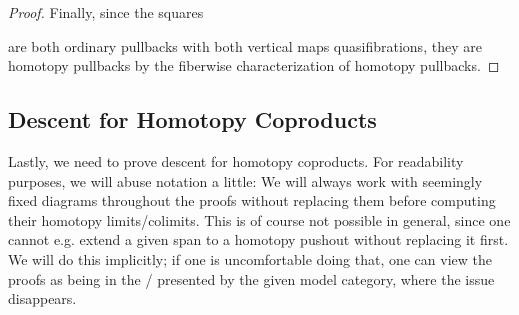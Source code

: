 \begin{prop}
\begin{proof}
        Finally, since the squares 
        \begin{center}
        \end{center}
        are both ordinary pullbacks with both vertical maps quasifibrations, they are homotopy pullbacks by the fiberwise characterization of homotopy pullbacks. 
    \end{proof}
\end{prop}
\subsection*{Descent for Homotopy Coproducts}
Lastly, we need to prove descent for homotopy coproducts.
For readability purposes, we will abuse notation a little:
We will always work with seemingly fixed diagrams throughout the proofs without replacing them before computing their homotopy limits/colimits.
This is of course not possible in general, since one cannot e.g. extend a given span to a homotopy pushout without replacing it first.
We will do this implicitly; if one is uncomfortable doing that, one can view the proofs as being in the \inftycat/ presented by the given model category, where the issue disappears.

